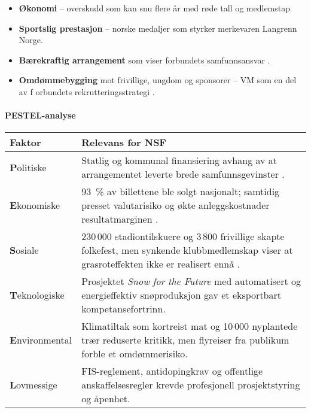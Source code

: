 \begin{itemize}
    \item \textbf{Økonomi} -- overskudd som kan snu flere år med røde tall og 
    medlemstap\cite{Adresseavisen}

    \item \textbf{Sportslig prestasjon} -- norske medaljer som styrker merkevaren Langrenn Norge.
    
    \item \textbf{Bærekraftig arrangement} som viser forbundets samfunnsansvar \cite{TrondheimKommune}.

    \item \textbf{Omdømmebygging} mot frivillige, ungdom og sponsorer -- VM som en del av f
    orbundets rekrutteringsstrategi \cite{OsloVM}.
\end{itemize}

\paragraph{PESTEL-analyse}

\begin{table}[ht]
    \centering
    \begin{tabular}{@{}p{2.7cm}p{10.2cm}@{}}
        \toprule
        \textbf{Faktor}        & \textbf{Relevans for NSF}                                                                                                                                                  \\ \midrule
        \textbf{P}olitiske     & Statlig og kommunal finansiering avhang av at arrangementet leverte brede samfunnsgevinster \cite{TrondheimKommune}.                                                       \\
        \textbf{E}konomiske    & 93~\% av billettene ble solgt nasjonalt; samtidig presset valutarisiko og økte anleggskostnader resultatmarginen \cite{AdressaKjopefest}.                                  \\
        \textbf{S}osiale       & 230\,000 stadiontilskuere og 3\,800 frivillige skapte folkefest, men synkende klubbmedlemskap viser at grasroteffekten ikke er realisert ennå \cite{Adresseavisen,OsloVM}. \\
        \textbf{T}eknologiske  & Prosjektet \textit{Snow for the Future} med automatisert og energieffektiv snøproduksjon gav et eksportbart kompetansefortrinn\cite{Trondheim2025Sustainability}.          \\
        \textbf{E}nvironmental & Klimatiltak som kortreist mat og 10\,000 nyplantede trær reduserte kritikk, men flyreiser fra publikum forble et omdømmerisiko.                                            \\
        \textbf{L}ovmessige    & FIS-reglement, antidopingkrav og offentlige anskaffelsesregler krevde profesjonell prosjektstyring og åpenhet.                                                             \\ \bottomrule
    \end{tabular}
\end{table}

